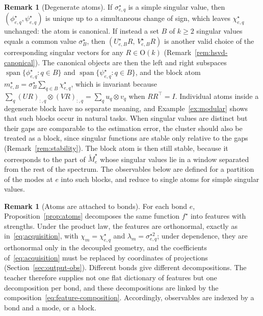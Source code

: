 \documentclass[11pt]{article}
\theoremstyle{definition}
\newtheorem{remark}[theorem]{Remark}
\numberwithin{equation}{section}
\begin{document}
\begin{remark}[Degenerate atoms]\label{rem:degenerate}
If $\sigma^\star_{e,q}$ is a simple singular value, then $(\phi^\star_{e,q},\psi^\star_{e,q})$ is unique up to a simultaneous change of sign, which leaves $\chi^\star_{e,q}$ unchanged: the atom is canonical. If instead a set $B$ of $k\ge2$ singular values equals a common value $\sigma^\star_B$, then $(U^\star_{e,B}R,\,V^\star_{e,B}R)$ is another valid choice of the corresponding singular vectors for any $R\in\mathrm O(k)$ (Remark~\ref{rem:hsvd-canonical}). The canonical objects are then the left and right subspaces $\operatorname{span}\{\phi^\star_{e,q}:q\in B\}$ and $\operatorname{span}\{\psi^\star_{e,q}:q\in B\}$, and the block atom $m^\star_{e,B}=\sigma^\star_B\sum_{q\in B}\chi^\star_{e,q}$, which is invariant because $\sum_q(UR)_{:,q}\otimes(VR)_{:,q}=\sum_qu_q\otimes v_q$ when $RR^\top=I$. Individual atoms inside a degenerate block have no separate meaning, and Example~\ref{ex:modular} shows that such blocks occur in natural tasks. When singular values are distinct but their gaps are comparable to the estimation error, the cluster should also be treated as a block, since singular functions are stable only relative to the gaps (Remark~\ref{rem:stability}). The block atom is then still stable, because it corresponds to the part of $\tilde M^\star_e$ whose singular values lie in a window separated from the rest of the spectrum. The observables below are defined for a partition of the modes at $e$ into such blocks, and reduce to single atoms for simple singular values.
\end{remark}

\begin{remark}[Atoms are attached to bonds]\label{rem:edge-specific}
For each bond $e$, Proposition~\ref{prop:atoms} decomposes the same function $f^\star$ into features with strengths. Under the product law, the features are orthonormal, exactly as in~\eqref{eq:acquisition}, with $\chi_m=\chi^\star_{e,q}$ and $\lambda_m=\sigma^{\star2}_{e,q}$; under dependence, they are orthonormal only in the decoupled geometry, and the coefficients of~\eqref{eq:acquisition} must be replaced by coordinates of projections (Section~\ref{sec:output-obs}). Different bonds give different decompositions. The teacher therefore supplies not one flat dictionary of features but one decomposition per bond, and these decompositions are linked by the composition~\eqref{eq:feature-composition}. Accordingly, observables are indexed by a bond and a mode, or a block.
\end{remark}
\end{document}
